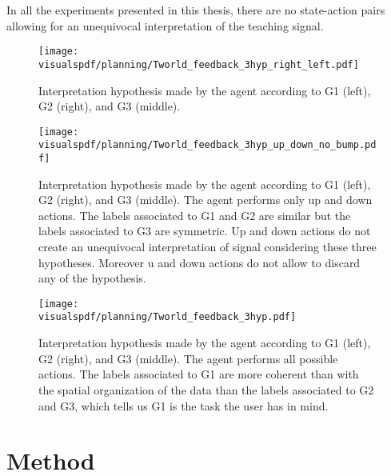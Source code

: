 In all the experiments presented in this thesis, there are no state-action pairs allowing for an unequivocal interpretation of the teaching signal.

\begin{figure}[!htbp]
  \centering
  \texttt{[image: \\visualspdf/planning/Tworld\_feedback\_3hyp\_right\_left.pdf]}
  \caption{Interpretation hypothesis made by the agent according to G1 (left), G2 (right), and G3 (middle). }
  \label{fig:planning3hyprightleft}
\end{figure}


\begin{figure}[!htbp]
  \centering
  \texttt{[image: \\visualspdf/planning/Tworld\_feedback\_3hyp\_up\_down\_no\_bump.pdf]}
  \caption{Interpretation hypothesis made by the agent according to G1 (left), G2 (right), and G3 (middle). The agent performs only up and down actions. The labels associated to G1 and G2 are similar but the labels associated to G3 are symmetric. Up and down actions do not create an unequivocal interpretation of signal considering these three hypotheses. Moreover u and down actions do not allow to discard any of the hypothesis.}
  \label{fig:planning3hypupdown}
\end{figure}

\begin{figure}[H]
  \centering
  \texttt{[image: \\visualspdf/planning/Tworld\_feedback\_3hyp.pdf]}
  \caption{Interpretation hypothesis made by the agent according to G1 (left), G2 (right), and G3 (middle). The agent performs all possible actions. The labels associated to G1 are more coherent than with the spatial organization of the data than the labels associated to G2 and G3, which tells us G1 is the task the user has in mind.}
  \label{fig:planning3hyp}
\end{figure}


\section{Method}
\label{chapter:planning:method}

